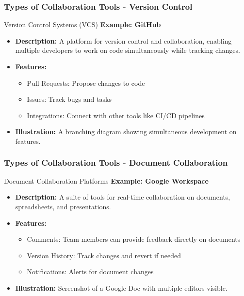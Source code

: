 \documentclass[aspectratio=169]{beamer}
\begin{document}
\begin{frame}[fragile]
    \frametitle{Types of Collaboration Tools - Version Control}
    \begin{block}{Version Control Systems (VCS)}
        \textbf{Example: GitHub}
        
        \begin{itemize}
            \item \textbf{Description:} A platform for version control and collaboration, enabling multiple developers to work on code simultaneously while tracking changes.
            \item \textbf{Features:}
                \begin{itemize}
                    \item Pull Requests: Propose changes to code
                    \item Issues: Track bugs and tasks
                    \item Integrations: Connect with other tools like CI/CD pipelines
                \end{itemize}
            \item \textbf{Illustration:} A branching diagram showing simultaneous development on features.
        \end{itemize}
    \end{block}
\end{frame}

\begin{frame}[fragile]
    \frametitle{Types of Collaboration Tools - Document Collaboration}
    \begin{block}{Document Collaboration Platforms}
        \textbf{Example: Google Workspace}
        
        \begin{itemize}
            \item \textbf{Description:} A suite of tools for real-time collaboration on documents, spreadsheets, and presentations.
            \item \textbf{Features:}
                \begin{itemize}
                    \item Comments: Team members can provide feedback directly on documents
                    \item Version History: Track changes and revert if needed
                    \item Notifications: Alerts for document changes
                \end{itemize}
            \item \textbf{Illustration:} Screenshot of a Google Doc with multiple editors visible.
        \end{itemize}
    \end{block}
\end{frame}
\end{document}
